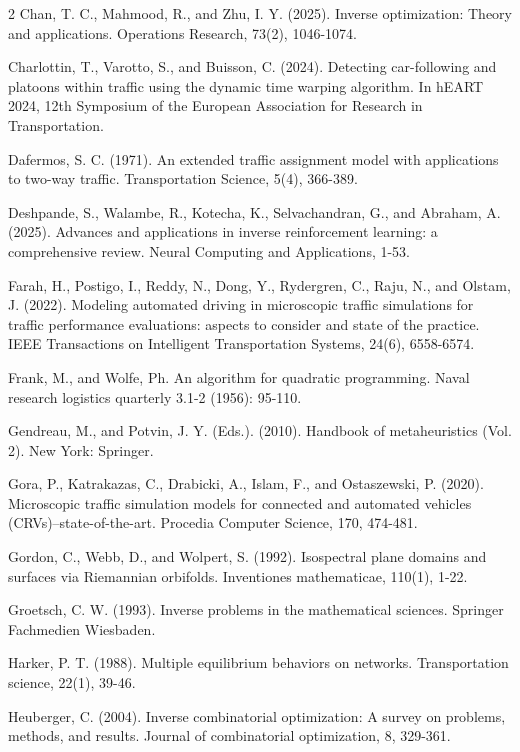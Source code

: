 \documentclass[a4paper,11pt]{article}
\begin{document}
\begin{thebibliography}{2}
 Chan, T. C., Mahmood, R., and Zhu, I. Y. (2025). Inverse optimization: Theory and applications. Operations Research, 73(2), 1046-1074.

 Charlottin, T., Varotto, S., and Buisson, C. (2024). Detecting car-following and platoons within traffic using the dynamic time warping algorithm. In hEART 2024, 12th Symposium of the European Association for Research in Transportation.

 Dafermos, S. C. (1971). An extended traffic assignment model with applications to two-way traffic. Transportation Science, 5(4), 366-389.

 Deshpande, S., Walambe, R., Kotecha, K., Selvachandran, G., and Abraham, A. (2025). Advances and applications in inverse reinforcement learning: a comprehensive review. Neural Computing and Applications, 1-53.

 Farah, H., Postigo, I., Reddy, N., Dong, Y., Rydergren, C., Raju, N., and Olstam, J. (2022). Modeling automated driving in microscopic traffic simulations for traffic performance evaluations: aspects to consider and state of the practice. IEEE Transactions on Intelligent Transportation Systems, 24(6), 6558-6574.

 Frank, M., and Wolfe, Ph. An algorithm for quadratic programming. Naval research logistics quarterly 3.1-2 (1956): 95-110.

 Gendreau, M., and Potvin, J. Y. (Eds.). (2010). Handbook of metaheuristics (Vol. 2). New York: Springer.

 Gora, P., Katrakazas, C., Drabicki, A., Islam, F., and Ostaszewski, P. (2020). Microscopic traffic simulation models for connected and automated vehicles (CRVs)–state-of-the-art. Procedia Computer Science, 170, 474-481.

 Gordon, C., Webb, D., and Wolpert, S. (1992). Isospectral plane domains and surfaces via Riemannian orbifolds. Inventiones mathematicae, 110(1), 1-22.

 Groetsch, C. W. (1993). Inverse problems in the mathematical sciences.  Springer Fachmedien Wiesbaden.

 Harker, P. T. (1988). Multiple equilibrium behaviors on networks. Transportation science, 22(1), 39-46.

 Heuberger, C. (2004). Inverse combinatorial optimization: A survey on problems, methods, and results. Journal of combinatorial optimization, 8, 329-361.


\end{thebibliography}
\end{document}

